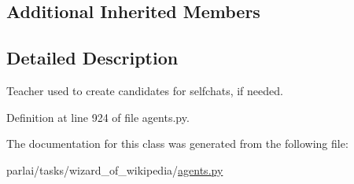 \subsection*{Additional Inherited Members}


\subsection{Detailed Description}
\begin{DoxyVerb}Teacher used to create candidates for selfchats, if needed.
\end{DoxyVerb}
 

Definition at line 924 of file agents.\+py.



The documentation for this class was generated from the following file\+:\begin{DoxyCompactItemize}
\item 
parlai/tasks/wizard\+\_\+of\+\_\+wikipedia/\hyperlink{parlai_2tasks_2wizard__of__wikipedia_2agents_8py}{agents.\+py}\end{DoxyCompactItemize}

